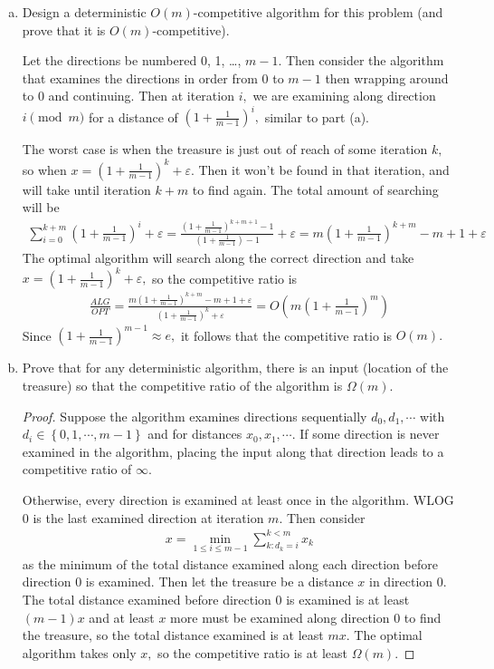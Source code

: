 \documentclass{article}
\begin{document}
\begin{enumerate}[(a), resume]
	\item Design a deterministic $O(m)$-competitive algorithm for this problem (and prove that it is $O(m)$-competitive).
		\begin{soln}
			Let the directions be numbered 0, 1, \ldots, $m-1.$ Then consider the algorithm that examines the directions in order from 0 to $m-1$ then wrapping around to 0 and continuing. Then at iteration $i,$ we are examining along direction $i\pmod m$ for a distance of $\left( 1+\frac{1}{m-1} \right)^i,$ similar to part (a).

			The worst case is when the treasure is just out of reach of some iteration $k,$ so when $x=\left( 1+\frac{1}{m-1} \right)^k +\varepsilon.$ Then it won't be found in that iteration, and will take until iteration $k+m$ to find again. The total amount of searching will be
			\begin{align*}
				\sum_{i=0}^{k+m}\left( 1+\frac{1}{m-1} \right)^i + \varepsilon = \frac{\left( 1+\frac{1}{m-1} \right)^{k+m+1}-1}{\left( 1+\frac{1}{m-1} \right) - 1} + \varepsilon = m\left( 1+\frac{1}{m-1} \right)^{k+m}-m+1+\varepsilon
			\end{align*}
			The optimal algorithm will search along the correct direction and take $x=\left( 1+\frac{1}{m-1} \right)^k + \varepsilon,$ so the competitive ratio is
			\begin{align*}
				\frac{ALG}{OPT} = \frac{m\left( 1+\frac{1}{m-1} \right)^{k+m}-m+1+\varepsilon}{\left( 1+\frac{1}{m-1} \right)^k+\varepsilon} = O\left( m\left( 1+\frac{1}{m-1} \right)^m \right)
			\end{align*}
			Since $\left( 1+\frac{1}{m-1} \right)^{m-1} \approx e,$ it follows that the competitive ratio is $O(m).$
		\end{soln}

	\item Prove that for any deterministic algorithm, there is an input (location of the treasure) so that the competitive ratio of the algorithm is $\Omega(m)$.  
		\begin{proof}
			Suppose the algorithm examines directions sequentially $d_0, d_1, \cdots$ with $d_i\in\left\{ 0, 1, \cdots, m-1 \right\}$ and for distances $x_0, x_1, \cdots.$ If some direction is never examined in the algorithm, placing the input along that direction leads to a competitive ratio of $\infty.$
			
			Otherwise, every direction is examined at least once in the algorithm. WLOG 0 is the last examined direction at iteration $m.$ Then consider
			\begin{align*}
				x = \min_{1\le i\le m-1} \sum_{k:d_k=i}^{k<m} x_k
			\end{align*}
			as the minimum of the total distance examined along each direction before direction 0 is examined. Then let the treasure be a distance $x$ in direction 0. The total distance examined before direction 0 is examined is at least $(m-1)x$ and at least $x$ more must be examined along direction 0 to find the treasure, so the total distance examined is at least $mx.$ The optimal algorithm takes only $x,$ so the competitive ratio is at least $\Omega(m).$
		\end{proof}

\end{enumerate}
\end{document}
